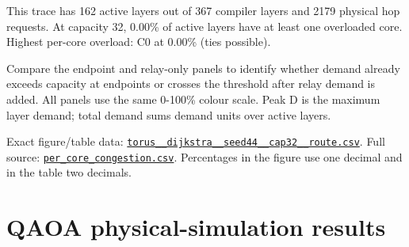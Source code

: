 \documentclass[10pt,a4paper]{article}
\begin{document}
This trace has 162 active layers out of 367 compiler layers and 2179 physical hop requests. At capacity 32, 0.00\% of active layers have at least one overloaded core. Highest per-core overload: C0 at 0.00\% (ties possible).\par
Compare the endpoint and relay-only panels to identify whether demand already exceeds capacity at endpoints or crosses the threshold after relay demand is added. All panels use the same 0-100\% colour scale. Peak D is the maximum layer demand; total demand sums demand units over active layers.\par
Exact figure/table data: \href{\detokenize{file:///home/dhruv-pansuriya/Documents/BTP/Compiler-Driven-ACE/output/pdf/qaoa_methods_congestion/tables/torus__dijkstra__seed44__cap32__route.csv}}{\nolinkurl{torus__dijkstra__seed44__cap32__route.csv}}. Full source: \href{\detokenize{file:///home/dhruv-pansuriya/Documents/BTP/Compiler-Driven-ACE/results/qaoa_2seed_2026-10-26/congestion/per_core_congestion.csv}}{\nolinkurl{per_core_congestion.csv}}. Percentages in the figure use one decimal and in the table two decimals.\par
\clearpage
\part*{QAOA physical-simulation results}
\end{document}
